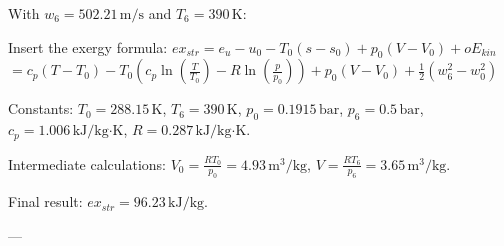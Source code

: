 With \( w_6 = 502.21 \, \text{m/s} \) and \( T_6 = 390 \, \text{K} \):  

Insert the exergy formula:  
\( ex_{str} = e_{u} - u_0 - T_0 (s - s_0) + p_0 (V - V_0) + o E_{kin} \)  
\( = c_p (T - T_0) - T_0 (c_p \ln \left( \frac{T}{T_0} \right) - R \ln \left( \frac{p}{p_0} \right)) + p_0 (V - V_0) + \frac{1}{2} (w_6^2 - w_0^2) \)  

Constants:  
\( T_0 = 288.15 \, \text{K} \), \( T_6 = 390 \, \text{K} \), \( p_0 = 0.1915 \, \text{bar} \), \( p_6 = 0.5 \, \text{bar} \), \( c_p = 1.006 \, \text{kJ/kg·K} \), \( R = 0.287 \, \text{kJ/kg·K} \).  

Intermediate calculations:  
\( V_0 = \frac{R T_0}{p_0} = 4.93 \, \text{m}^3/\text{kg} \), \( V = \frac{R T_6}{p_6} = 3.65 \, \text{m}^3/\text{kg} \).  

Final result:  
\( ex_{str} = 96.23 \, \text{kJ/kg} \).  

---